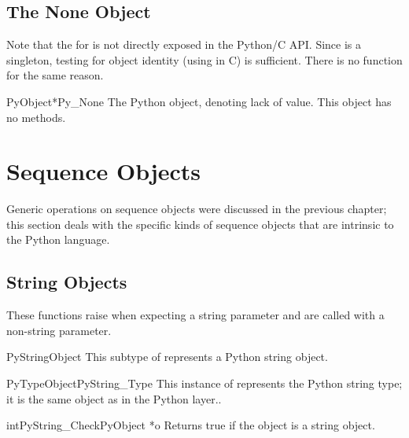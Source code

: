 \documentclass{manual}
\begin{document}
\subsection{The None Object \label{noneObject}}

Note that the  for  is not directly
exposed in the Python/C API.  Since  is a singleton,
testing for object identity (using \samp{==} in C) is sufficient.
There is no  function for the same reason.

\begin{cvardesc}{PyObject*}{Py_None}
The Python  object, denoting lack of value.  This object has
no methods.
\end{cvardesc}


\section{Sequence Objects \label{sequenceObjects}}

Generic operations on sequence objects were discussed in the previous 
chapter; this section deals with the specific kinds of sequence 
objects that are intrinsic to the Python language.


\subsection{String Objects \label{stringObjects}}

These functions raise  when expecting a string
parameter and are called with a non-string parameter.

\begin{ctypedesc}{PyStringObject}
This subtype of  represents a Python string object.
\end{ctypedesc}

\begin{cvardesc}{PyTypeObject}{PyString_Type}
This instance of  represents the Python string
type; it is the same object as  in the Python
layer..
\end{cvardesc}

\begin{cfuncdesc}{int}{PyString_Check}{PyObject *o}
Returns true if the object  is a string object.
\end{cfuncdesc}
\end{document}
